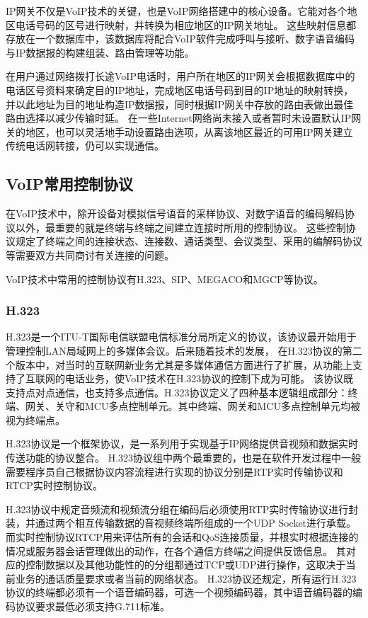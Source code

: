 \documentclass[a4paper,AutoFakeBold,oneside,12pt]{book}
\begin{document}
IP网关不仅是VoIP技术的关键，也是VoIP网络搭建中的核心设备。它能对各个地区电话号码的区号进行映射，并转换为相应地区的IP网关地址。
这些映射信息都存放在一个数据库中，该数据库将配合VoIP软件完成呼叫与接听、数字语音编码与IP数据报的构建组装、路由管理等功能。

在用户通过网络拨打长途VoIP电话时，用户所在地区的IP网关会根据数据库中的电话区号资料来确定目的IP地址，完成地区电话号码到目的IP地址的映射转换，
并以此地址为目的地址构造IP数据报，同时根据IP网关中存放的路由表做出最佳路由选择以减少传输时延。
在一些Internet网络尚未接入或者暂时未设置默认IP网关的地区，也可以灵活地手动设置路由选项，从离该地区最近的可用IP网关建立传统电话网转接，仍可以实现通信。
\subsection{VoIP常用控制协议}
在VoIP技术中，除开设备对模拟信号语音的采样协议、对数字语音的编码解码协议以外，最重要的就是终端与终端之间建立连接时所用的控制协议。
这些控制协议规定了终端之间的连接状态、连接数、通话类型、会议类型、采用的编解码协议等需要双方共同商讨有关连接的问题。

VoIP技术中常用的控制协议有H.323、SIP、MEGACO和MGCP等协议。
\subsubsection{H.323}
H.323是一个ITU-T国际电信联盟电信标准分局所定义的协议，该协议最开始用于管理控制LAN局域网上的多媒体会议。后来随着技术的发展，
在H.323协议的第二个版本中，对当时的互联网新业务尤其是多媒体通信方面进行了扩展，从功能上支持了互联网的电话业务，使VoIP技术在H.323协议的控制下成为可能。
该协议既支持点对点通信，也支持多点通信。H.323协议定义了四种基本逻辑组成部分：终端、网关、关守和MCU多点控制单元。其中终端、网关和MCU多点控制单元均被视为终端点。

H.323协议是一个框架协议，是一系列用于实现基于IP网络提供音视频和数据实时传送功能的协议整合。
H.323协议组中两个最重要的，也是在软件开发过程中一般需要程序员自己根据协议内容流程进行实现的协议分别是RTP实时传输协议和RTCP实时控制协议。

H.323协议中规定音频流和视频流分组在编码后必须使用RTP实时传输协议进行封装，并通过两个相互传输数据的音视频终端所组成的一个UDP Socket进行承载。
而实时控制协议RTCP用来评估所有的会话和QoS连接质量，并根实时根据连接的情况或服务器会话管理做出的动作，在各个通信方终端之间提供反馈信息。
其对应的控制数据以及其他功能性的的分组都通过TCP或UDP进行操作，这取决于当前业务的通话质量要求或者当前的网络状态。
H.323协议还规定，所有运行H.323协议的终端都必须有一个语音编码器，可选一个视频编码器，其中语音编码器的编码协议要求最低必须支持G.711标准。
\end{document}
